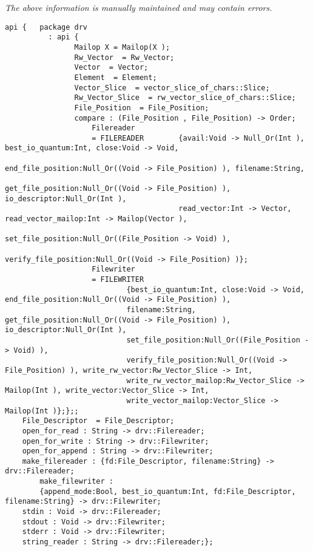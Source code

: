 \label{pkg:winix\_text\_file\_io\_driver\_for\_posix}

{\tiny \it The above information is manually maintained and may contain errors.}
\begin{verbatim}
api {   package drv
          : api {
                Mailop X = Mailop(X );
                Rw_Vector  = Rw_Vector;
                Vector  = Vector;
                Element  = Element;
                Vector_Slice  = vector_slice_of_chars::Slice;
                Rw_Vector_Slice  = rw_vector_slice_of_chars::Slice;
                File_Position  = File_Position;
                compare : (File_Position , File_Position) -> Order;
                    Filereader
                    = FILEREADER        {avail:Void -> Null_Or(Int ), best_io_quantum:Int, close:Void -> Void,
                                        end_file_position:Null_Or((Void -> File_Position) ), filename:String,
                                        get_file_position:Null_Or((Void -> File_Position) ), io_descriptor:Null_Or(Int ),
                                        read_vector:Int -> Vector, read_vector_mailop:Int -> Mailop(Vector ),
                                        set_file_position:Null_Or((File_Position -> Void) ),
                                        verify_file_position:Null_Or((Void -> File_Position) )};
                    Filewriter
                    = FILEWRITER
                            {best_io_quantum:Int, close:Void -> Void, end_file_position:Null_Or((Void -> File_Position) ),
                            filename:String, get_file_position:Null_Or((Void -> File_Position) ), io_descriptor:Null_Or(Int ),
                            set_file_position:Null_Or((File_Position -> Void) ),
                            verify_file_position:Null_Or((Void -> File_Position) ), write_rw_vector:Rw_Vector_Slice -> Int,
                            write_rw_vector_mailop:Rw_Vector_Slice -> Mailop(Int ), write_vector:Vector_Slice -> Int,
                            write_vector_mailop:Vector_Slice -> Mailop(Int )};};;
    File_Descriptor  = File_Descriptor;
    open_for_read : String -> drv::Filereader;
    open_for_write : String -> drv::Filewriter;
    open_for_append : String -> drv::Filewriter;
    make_filereader : {fd:File_Descriptor, filename:String} -> drv::Filereader;
        make_filewriter :
        {append_mode:Bool, best_io_quantum:Int, fd:File_Descriptor, filename:String} -> drv::Filewriter;
    stdin : Void -> drv::Filereader;
    stdout : Void -> drv::Filewriter;
    stderr : Void -> drv::Filewriter;
    string_reader : String -> drv::Filereader;};
\end{verbatim}
